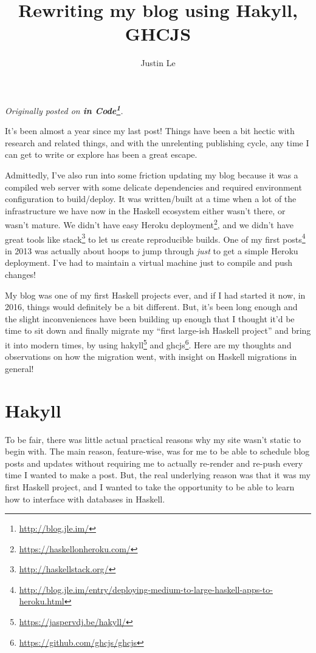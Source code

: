 \documentclass[]{article}
\title{Rewriting my blog using Hakyll, GHCJS}
\author{Justin Le}
\renewcommand{\href}[2]{#2\footnote{\url{#1}}}
\begin{document}
\maketitle

\emph{Originally posted on \textbf{\href{http://blog.jle.im/}{in
Code}}.}

It's been almost a year since my last post! Things have been a bit
hectic with research and related things, and with the unrelenting
publishing cycle, any time I can get to write or explore has been a
great escape.

Admittedly, I've also run into some friction updating my blog because it
was a compiled web server with some delicate dependencies and required
environment configuration to build/deploy. It was written/built at a
time when a lot of the infrastructure we have now in the Haskell
ecosystem either wasn't there, or wasn't mature. We didn't have easy
\href{https://haskellonheroku.com/}{Heroku deployment}, and we didn't
have great tools like \href{http://haskellstack.org/}{stack} to let us
create reproducible builds. One of my
\href{http://blog.jle.im/entry/deploying-medium-to-large-haskell-apps-to-heroku.html}{first
posts} in 2013 was actually about hoops to jump through \emph{just} to
get a simple Heroku deployment. I've had to maintain a virtual machine
just to compile and push changes!

My blog was one of my first Haskell projects ever, and if I had started
it now, in 2016, things would definitely be a bit different. But, it's
been long enough and the slight inconveniences have been building up
enough that I thought it'd be time to sit down and finally migrate my
``first large-ish Haskell project'' and bring it into modern times, by
using \href{https://jaspervdj.be/hakyll/}{hakyll} and
\href{https://github.com/ghcjs/ghcjs}{ghcjs}. Here are my thoughts and
observations on how the migration went, with insight on Haskell
migrations in general!

\section{Hakyll}\label{hakyll}

To be fair, there was little actual practical reasons why my site wasn't
static to begin with. The main reason, feature-wise, was for me to be
able to schedule blog posts and updates without requiring me to actually
re-render and re-push every time I wanted to make a post. But, the real
underlying reason was that it was my first Haskell project, and I wanted
to take the opportunity to be able to learn how to interface with
databases in Haskell.
\end{document}

